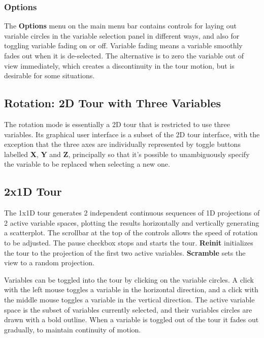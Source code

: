 \documentclass[11pt]{article}
\begin{document}
\subsubsection{Options}

The {\bf Options} menu on the main menu bar contains controls for
laying out variable circles in the variable selection panel in
different ways, and also for toggling variable fading on or
off. Variable fading means a variable smoothly fades out when it is
de-selected. The alternative is to zero the variable out of view
immediately, which creates a discontinuity in the tour motion, but is
desirable for some situations.

\subsection{Rotation: 2D Tour with Three Variables}
\label{slbl:Rotation}

The rotation mode is essentially a 2D tour that is restricted to use
three variables.  Its graphical user interface is a subset of the 2D
tour interface, with the exception that the three axes are individually
represented by toggle buttons labelled {\bf X}, {\bf Y} and {\bf Z},
principally so that it's possible to unambiguously specify the variable
to be replaced when selecting a new one.

\subsection{2x1D Tour}
\label{slbl:2x1DTour}

The 1x1D tour generates 2 independent continuous sequences of 1D
projections of 2 active variable spaces, plotting the results
horizontally and vertically generating a scatterplot. The scrollbar at
the top of the controls allows the speed of rotation to be
adjusted. The pause checkbox stops and starts the tour. {\bf Reinit}
initializes the tour to the projection of the first two active
variables. {\bf Scramble} sets the view to a random projection.

Variables can be toggled into the tour by clicking on the variable
circles. A click with the left mouse toggles a variable in the horizontal
direction, and a click with the middle mouse toggles a variable in
the vertical direction. The active variable space is the subset of
variables currently selected, and their variables circles are drawn with
a bold outline. When a variable is toggled out of the tour it fades out
gradually, to maintain continuity of motion.
\end{document}
